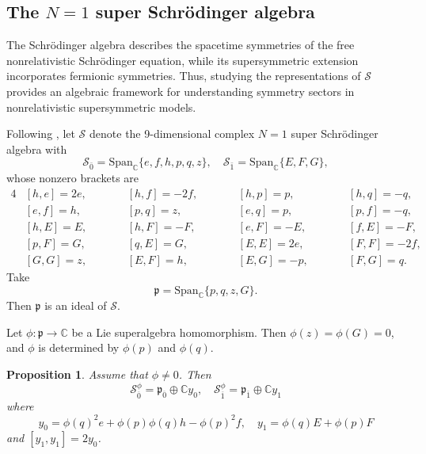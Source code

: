 \documentclass[12pt,reqno]{article}
\newtheorem{prop}[thm]{Proposition}
\def\F{\mathfrak}
\def\r{\mathrm}
\def\C{\mathcal}
\def\CC{\mathbb{C}}
\def\beqn{\begin{equation*}}
\def\eeqn{\end{equation*}}
\begin{document}
\subsection{The $N=1$ super Schrödinger algebra}

The Schr\"odinger algebra describes the spacetime symmetries of the free nonrelativistic Schr\"odinger equation, while its supersymmetric extension incorporates fermionic symmetries. Thus, studying the representations of $\C{S}$ provides an algebraic framework for understanding symmetry sectors in nonrelativistic supersymmetric models.

Following \cite{WCM}, let $\C{S}$ denote the 9-dimensional complex $N=1$ super Schrödinger algebra with
\beqn
\C{S}_{\bar{0}} = \r{Span}_{\mathbb{C}}\{e, f, h, p, q, z\}, \quad \C{S}_{\bar{1}} = \r{Span}_{\mathbb{C}}\{E, F, G\},
\eeqn  
whose nonzero brackets are
\begin{alignat*}{4}
&[h,e] = 2e,  &\qquad &[h,f] = -2f,  &\qquad &[h,p] = p,  &\qquad &[h,q] = -q, \\
&[e,f] = h,   &\qquad &[p,q] = z,    &\qquad &[e,q] = p,  &\qquad &[p,f] = -q, \\
&[h,E] = E,   &\qquad &[h,F] = -F,   &\qquad &[e,F] = -E, &\qquad &[f,E] = -F, \\
&[p,F] = G,   &\qquad &[q,E] = G,    &\qquad &[E,E] = 2e, &\qquad &[F,F] = -2f, \\
&[G,G] = z,   &\qquad &[E,F] = h,    &\qquad &[E,G] = -p, &\qquad &[F,G] = q.
\end{alignat*}
Take 
\beqn
\F{p} = \r{Span}_{\mathbb{C}}\{p, q, z, G\}.
\eeqn
Then $\F{p}$ is an ideal of $\C{S}$. 

Let $\phi\colon \F{p}\rightarrow \CC$ 
be a Lie superalgebra homomorphism. Then
$\phi(z)=\phi(G)=0$, and $\phi$ is determined by $\phi(p)$ and $\phi(q)$.


\begin{prop}
Assume that $\phi\neq 0$. Then
\beqn
\C{S}^{\phi}_{\overline 0}=\F{p}_{\overline 0}\oplus \mathbb{C}y_0,\quad \C{S}^{\phi}_{\overline 1}=\F{p}_{\overline 1}\oplus \mathbb{C}y_1
\eeqn
where
\beqn
y_0=\phi(q)^2e+\phi(p)\phi(q)h-\phi(p)^2f,\quad y_1=\phi(q)E+\phi(p)F
\eeqn
and $[y_1,y_1]=2y_0$.
\end{prop}
\end{document}
